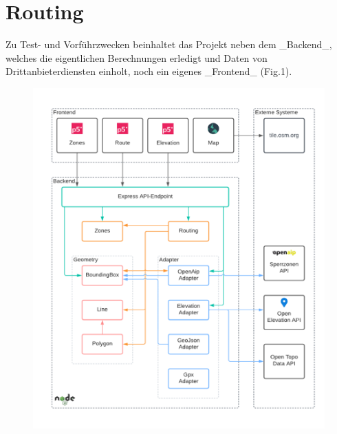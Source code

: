 \section*{Routing}

Zu Test- und Vorführzwecken beinhaltet das Projekt neben dem \_Backend\_, welches die eigentlichen Berechnungen erledigt und Daten von Drittanbieterdiensten einholt, noch ein eigenes \_Frontend\_ (Fig.1).

\begin{figure}[h]
    \includegraphics[width=\columnwidth]{images/architektur}
\end{figure}




